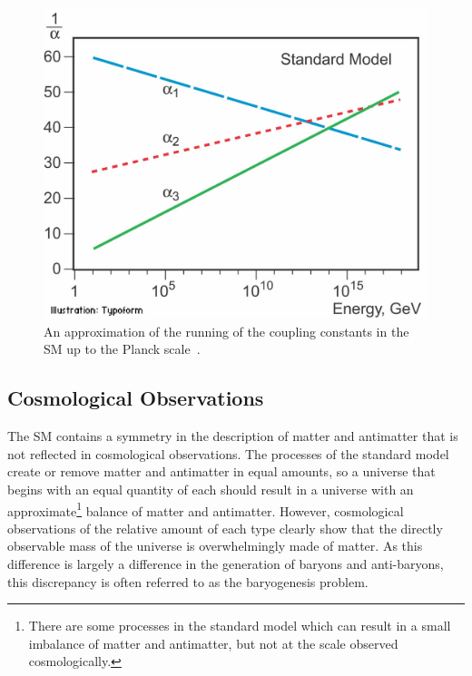 \begin{figure}
\includegraphics[width=\fullfig]{figures/unification_sm.jpg}
\caption{An approximation of the running of the coupling constants in the \ac{SM} up to the Planck scale~\cite{unification_plot}.}
\label{fig:unification_sm}
\end{figure}

\subsection{Cosmological Observations}

The \ac{SM} contains a symmetry in the description of matter and antimatter that is not reflected in cosmological observations.
The processes of the standard model create or remove matter and antimatter in equal amounts, so a universe that begins with an equal quantity of each should result in a universe with an approximate\footnote{There are some processes in the standard model which can result in a small imbalance of matter and antimatter, but not at the scale observed cosmologically.} balance of matter and antimatter.
However, cosmological observations of the relative amount of each type clearly show that the directly observable mass of the universe is overwhelmingly made of matter.
As this difference is largely a difference in the generation of baryons and anti-baryons, this discrepancy is often referred to as the baryogenesis problem.


